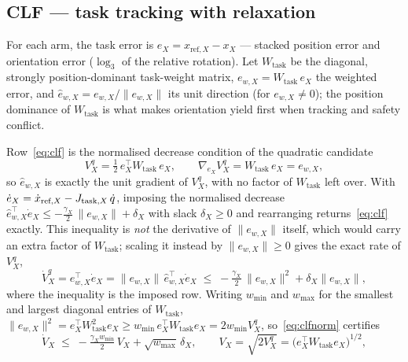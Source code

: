 \subsection{CLF --- task tracking with relaxation}
\label{sec:clf}

For each arm, the task error is $e_X = x_{\text{ref},X} - x_X$ --- stacked position error and orientation error ($\log_3$ of the relative rotation). Let $W_{\text{task}}$ be the diagonal, strongly position-dominant task-weight matrix, $e_{w,X} = W_{\text{task}}\,e_X$ the weighted error, and $\hat{e}_{w,X} = e_{w,X}/\|e_{w,X}\|$ its unit direction (for $e_{w,X} \neq 0$); the position dominance of $W_{\text{task}}$ is what makes orientation yield first when tracking and safety conflict.

Row~\eqref{eq:clf} is the normalised decrease condition of the quadratic candidate
\begin{equation}
V_X^{q} = \tfrac{1}{2}\,e_X^{\top} W_{\text{task}}\,e_X,
\qquad
\nabla_{e_X} V_X^{q} = W_{\text{task}}\,e_X = e_{w,X},
\label{eq:clfquadgrad}
\end{equation}
so $\hat{e}_{w,X}$ is exactly the unit gradient of $V_X^{q}$, with no factor of $W_{\text{task}}$ left over. With $\dot{e}_X = \dot{x}_{\text{ref},X} - J_{\text{task},X}\,\dot{q}$, imposing the normalised decrease $\hat{e}_{w,X}^{\top}\dot{e}_X \le -\tfrac{\gamma_X}{2}\,\|e_{w,X}\| + \delta_X$ with slack $\delta_X \ge 0$ and rearranging returns~\eqref{eq:clf} exactly. This inequality is \emph{not} the derivative of $\|e_{w,X}\|$ itself, which would carry an extra factor of $W_{\text{task}}$; scaling it instead by $\|e_{w,X}\| \ge 0$ gives the exact rate of $V_X^{q}$,
\begin{equation}
\dot{V}_X^{q} = e_{w,X}^{\top}\dot{e}_X = \|e_{w,X}\|\,\hat{e}_{w,X}^{\top}\dot{e}_X \;\le\; -\tfrac{\gamma_X}{2}\,\|e_{w,X}\|^2 + \delta_X\|e_{w,X}\|,
\label{eq:clfnorm}
\end{equation}
where the inequality is the imposed row. Writing $w_{\min}$ and $w_{\max}$ for the smallest and largest diagonal entries of $W_{\text{task}}$, $\|e_{w,X}\|^2 = e_X^{\top}W_{\text{task}}^2 e_X \ge w_{\min}\,e_X^{\top}W_{\text{task}}e_X = 2w_{\min}V_X^{q}$, so~\eqref{eq:clfnorm} certifies
\begin{equation}
\dot{V}_X \;\le\; -\tfrac{\gamma_X w_{\min}}{2}\,V_X + \sqrt{w_{\max}}\,\delta_X, \qquad V_X = \sqrt{2V_X^{q}} = \bigl(e_X^{\top}W_{\text{task}}e_X\bigr)^{1/2},
\label{eq:clfrate}
\end{equation}
